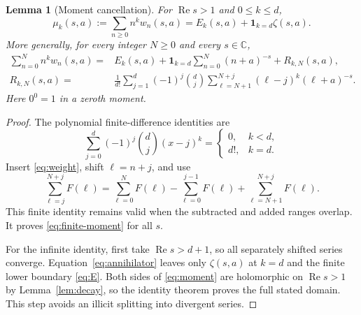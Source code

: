 \documentclass[11pt,letterpaper]{article}
\numberwithin{equation}{section}
\newtheorem{lemma}[theorem]{Lemma}
\theoremstyle{definition}\newtheorem{definition}[theorem]{Definition}
\theoremstyle{remark}\newtheorem{remark}[theorem]{Remark}
\DeclareMathOperator{\Rea}{Re}
\newcommand{\C}{\mathbb C}\newcommand{\Q}{\mathbb Q}\newcommand{\N}{\mathbb N}
\begin{document}
\begin{lemma}[Moment cancellation]\label{lem:moments}
For $\Rea s>1$ and $0\le k\le d$,
\begin{equation}\label{eq:moment}
 \mu_k(s,a):=\sum_{n\ge0}n^k w_n(s,a)
       =E_k(s,a)+\mathbf1_{k=d}\zeta(s,a).
\end{equation}
More generally, for every integer $N\ge0$ and every $s\in\C$,
\begin{align}
 \sum_{n=0}^Nn^k w_n(s,a)
 ={}&E_k(s,a)+\mathbf1_{k=d}\sum_{n=0}^N(n+a)^{-s}
       +R_{k,N}(s,a),\label{eq:finite-moment}\\
 R_{k,N}(s,a)
 ={}&\frac1{d!}\sum_{j=1}^d(-1)^j\binom dj
       \sum_{\ell=N+1}^{N+j}(\ell-j)^k(\ell+a)^{-s}.
       \label{eq:upper-boundary}
\end{align}
Here $0^0=1$ in a zeroth moment.
\end{lemma}
\begin{proof}
The polynomial finite-difference identities are
\begin{equation}\label{eq:annihilator}
 \sum_{j=0}^d(-1)^j\binom dj(x-j)^k
 =\begin{cases}0,&k<d,\\ d!,&k=d.\end{cases}
\end{equation}
Insert \eqref{eq:weight}, shift $\ell=n+j$, and use
\[
 \sum_{\ell=j}^{N+j}F(\ell)
 =\sum_{\ell=0}^{N}F(\ell)
  -\sum_{\ell=0}^{j-1}F(\ell)
  +\sum_{\ell=N+1}^{N+j}F(\ell).
\]
This finite identity remains valid when the subtracted and added ranges
overlap. It proves \eqref{eq:finite-moment} for all $s$.

For the infinite identity, first take $\Rea s>d+1$, so all separately
shifted series converge. Equation~\eqref{eq:annihilator} leaves only
$\zeta(s,a)$ at $k=d$ and the finite lower boundary \eqref{eq:E}.
Both sides of \eqref{eq:moment} are holomorphic on $\Rea s>1$ by
Lemma~\ref{lem:decay}, so the identity theorem proves the full stated
domain. This step avoids an illicit splitting into divergent series.
\end{proof}
\end{document}
